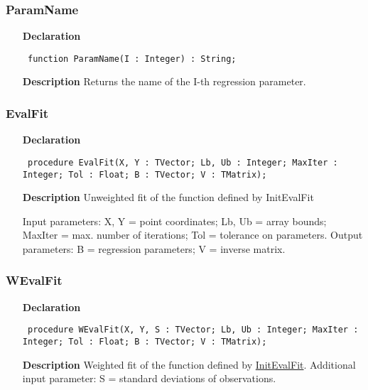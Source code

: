 \documentclass[12pt,a4paper,oneside]{report}
\newcommand{\declarationitem}[1]{\textbf{#1}}
\newcommand{\descriptiontitle}[1]{\textbf{#1}}
\newcommand{\code}[1]{\texttt{#1}}
\begin{document}
\subsubsection{ParamName}
\label{uevalfit-ParamName}
\begin{itemize}\item[\declarationitem{Declaration}\hfill]
	\begin{flushleft}
		\code{
			function ParamName(I : Integer) : String;}
		
	\end{flushleft}
	
	\par
	\item[\descriptiontitle{Description}]
	Returns the name of the I{-}th regression parameter.
	
\end{itemize}
\subsubsection{EvalFit}
\label{uevalfit-EvalFit}
\begin{itemize}\item[\declarationitem{Declaration}\hfill]
	\begin{flushleft}
		\code{
			procedure EvalFit(X, Y : TVector; Lb, Ub : Integer; MaxIter : Integer; Tol : Float; B : TVector; V : TMatrix);}
		
	\end{flushleft}
	
	\par
	\item[\descriptiontitle{Description}]
	Unweighted fit of the function defined by InitEvalFit
	
	Input parameters: X, Y = point coordinates; Lb, Ub = array bounds; MaxIter = max. number of iterations; Tol = tolerance on parameters. Output parameters: B = regression parameters; V = inverse matrix.
	
\end{itemize}
\subsubsection{WEvalFit}
\label{uevalfit-WEvalFit}
\begin{itemize}\item[\declarationitem{Declaration}\hfill]
	\begin{flushleft}
		\code{
			procedure WEvalFit(X, Y, S : TVector; Lb, Ub : Integer; MaxIter : Integer; Tol : Float; B : TVector; V : TMatrix);}
		
	\end{flushleft}
	
	\par
	\item[\descriptiontitle{Description}]
	Weighted fit of the function defined by \hyperref[uevalfit-InitEvalFit]{InitEvalFit}.	
	Additional input parameter: S = standard deviations of observations.
	
\end{itemize}
\end{document}
